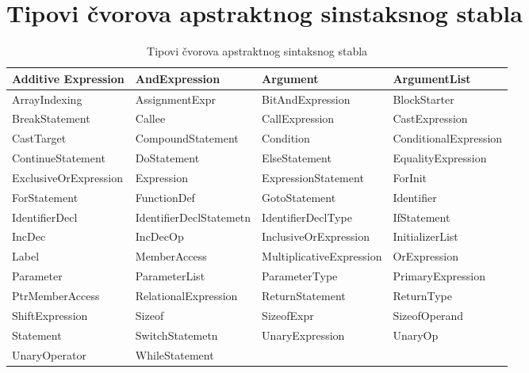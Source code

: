 \appendix
\chapter{Tipovi čvorova apstraktnog sinstaksnog stabla}\label{node_types}

\begin{table}[H]
\centering
\caption{Tipovi čvorova apstraktnog sintaksnog stabla}
\label{node_types_table}
\begin{adjustbox}{width=\textwidth}
\centering
\begin{tabular}{|l|l|l|l|}
\hline

Additive Expression   & AndExpression           & Argument                 & ArgumentList          \\ \hline
ArrayIndexing         & AssignmentExpr          & BitAndExpression         & BlockStarter          \\ \hline
BreakStatement        & Callee                  & CallExpression           & CastExpression        \\ \hline
CastTarget            & CompoundStatement       & Condition                & ConditionalExpression \\ \hline
ContinueStatement     & DoStatement             & ElseStatement            & EqualityExpression    \\ \hline
ExclusiveOrExpression & Expression              & ExpressionStatement      & ForInit               \\ \hline
ForStatement          & FunctionDef             & GotoStatement            & Identifier            \\ \hline
IdentifierDecl        & IdentifierDeclStatemetn & IdentifierDeclType       & IfStatement           \\ \hline
IncDec                & IncDecOp                & InclusiveOrExpression    & InitializerList       \\ \hline
Label                 & MemberAccess            & MultiplicativeExpression & OrExpression          \\ \hline
Parameter             & ParameterList           & ParameterType            & PrimaryExpression     \\ \hline
PtrMemberAccess       & RelationalExpression    & ReturnStatement          & ReturnType            \\ \hline
ShiftExpression       & Sizeof                  & SizeofExpr               & SizeofOperand         \\ \hline
Statement             & SwitchStatemetn         & UnaryExpression          & UnaryOp               \\ \hline
UnaryOperator         & WhileStatement          & \multicolumn{2}{l|}{}                            \\ \hline

\end{tabular}
\end{adjustbox}
\end{table}